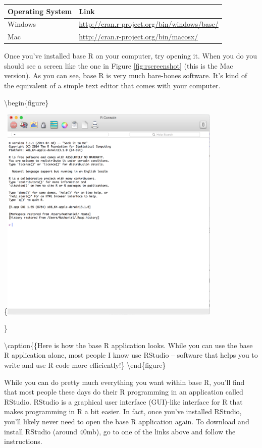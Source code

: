 \documentclass[]{book}
\theoremstyle{definition}
\theoremstyle{definition}
\theoremstyle{remark}
\begin{document}
\begin{longtable}[]{@{}ll@{}}
\toprule
Operating System & Link\tabularnewline
\midrule
\endhead
Windows &
\url{http://cran.r-project.org/bin/windows/base/}\tabularnewline
Mac & \url{http://cran.r-project.org/bin/macosx/}\tabularnewline
\bottomrule
\end{longtable}

Once you've installed base R on your computer, try opening it. When you
do you should see a screen like the one in Figure \ref{fig:rscreenshot}
(this is the Mac version). As you can see, base R is very much
bare-bones software. It's kind of the equivalent of a simple text editor
that comes with your computer.

\textbackslash{}begin\{figure\}

\{\centering \includegraphics[width=400px]{images/RScreenshot}

\}

\textbackslash{}caption\{\{Here is how the base R application looks.
While you can use the base R application alone, most people I know use
RStudio -- software that helps you to write and use R code more
efficiently!\}\label{fig:unnamed-chunk-8} \textbackslash{}end\{figure\}

While you can do pretty much everything you want within base R, you'll
find that most people these days do their R programming in an
application called RStudio. RStudio is a graphical user interface
(GUI)-like interface for R that makes programming in R a bit easier. In
fact, once you've installed RStudio, you'll likely never need to open
the base R application again. To download and install RStudio (around
40mb), go to one of the links above and follow the instructions.
\end{document}
